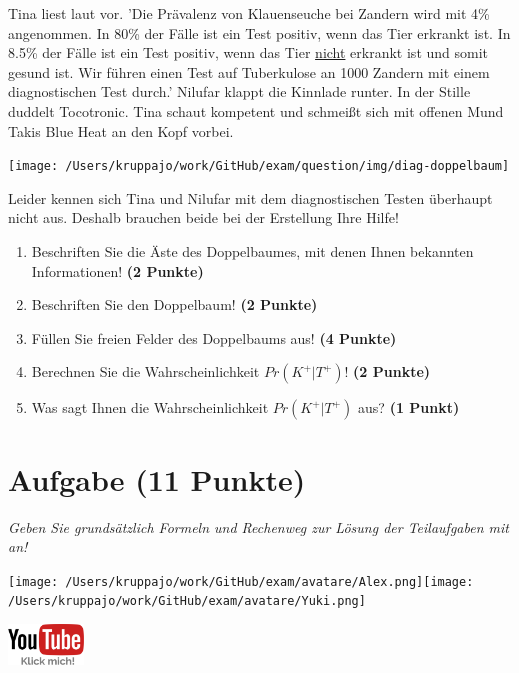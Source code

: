 \documentclass[a4paper, 9pt]{scrartcl}\usepackage[]{graphicx}\usepackage[]{xcolor}
\begin{document}
Tina liest laut vor. 'Die Prävalenz von Klauenseuche bei Zandern wird mit 4\% angenommen. In 80\% der Fälle ist ein Test positiv, wenn das Tier erkrankt ist. In 8.5\% der Fälle ist ein Test positiv, wenn das Tier \underline{nicht} erkrankt ist und somit gesund ist. Wir führen einen Test auf Tuberkulose an 1000 Zandern mit einem diagnostischen Test durch.' Nilufar klappt die Kinnlade runter. In der Stille duddelt Tocotronic. Tina schaut kompetent und schmeißt sich mit offenen Mund Takis Blue Heat an den Kopf vorbei.

\begin{center}
  \texttt{[image: /Users/kruppajo/work/GitHub/exam/question/img/diag-doppelbaum]}
\end{center}

Leider kennen sich Tina und Nilufar mit dem diagnostischen Testen überhaupt nicht aus. Deshalb brauchen beide bei der Erstellung Ihre Hilfe! 
    
\begin{enumerate}
\item Beschriften Sie die Äste des Doppelbaumes, mit denen Ihnen bekannten Informationen! \textbf{(2 Punkte)}
\item Beschriften Sie den Doppelbaum! \textbf{(2 Punkte)}
\item Füllen Sie freien Felder des Doppelbaums aus! \textbf{(4 Punkte)}
\item Berechnen Sie die Wahrscheinlichkeit $Pr(K^+|T^+)$! \textbf{(2 Punkte)}
\item Was sagt Ihnen die Wahrscheinlichkeit $Pr(K^+|T^+)$ aus? \textbf{(1 Punkt)}
\end{enumerate}






 
\clearpage

\section{Aufgabe \hfill (11 Punkte)}

\textit{Geben Sie grundsätzlich Formeln und Rechenweg zur Lösung der Teilaufgaben mit an!} \\[1Ex]
 

 
\begin{minipage}[t]{0.5\textwidth}
\texttt{[image: /Users/kruppajo/work/GitHub/exam/avatare/Alex.png]}\hspace{-4mm}\texttt{[image: /Users/kruppajo/work/GitHub/exam/avatare/Yuki.png]}
\end{minipage}
\begin{minipage}[t]{0.5\textwidth}
\hfill
\href{https://youtu.be/_7s44pbOc00}{\includegraphics[width = 2cm]{img/youtube}}
\end{minipage}
\end{document}
